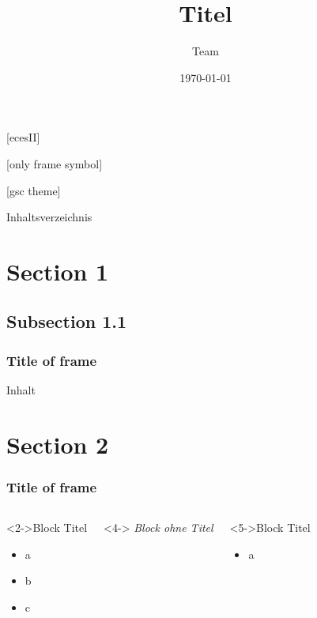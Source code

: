 \documentclass[table]{beamer}
\title[]{ Titel \\
\footnotesize\sf {Teammember 1, Teammember 2, Teammember 3}}
\author[Teammember 1 | Teammember 2 | Teammember 3 ]{Team}
\date[]{\today}
\begin{document}
[ecesII]

[only frame symbol]

[gsc theme]

\setcounter{tocdepth}{1}
\begin{frame}{Inhaltsverzeichnis}
\tableofcontents
\end{frame}
\setcounter{tocdepth}{2}

\section{Section 1}
\subsection{Subsection 1.1}
	\begin{frame}
	\frametitle{Title of frame}
 		Inhalt
	\end{frame}	
\section{Section 2}
	\begin{frame}
	\frametitle{Title of frame}
	\begin{columns}[T]
			\begin{block}<2->{Block Titel}
				\begin{itemize}
					\item<3-> a
					\item<3-> b
					\item<3-> c
				\end{itemize}
			\end{block}
			\begin{block}<4->{}
				\emph{Block ohne Titel}
			\end{block}
			\begin{block}<5->{Block Titel}
				\begin{itemize}
					\item a
				\end{itemize}
			\end{block}
	\end{columns}
	\end{frame}
\end{document}
